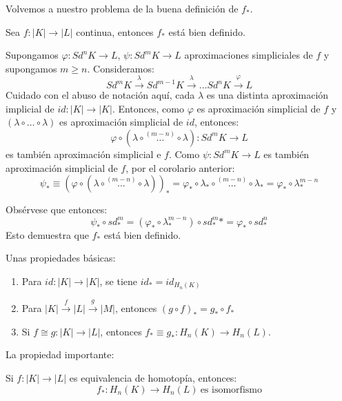 \documentclass[HS.tex]{subfiles}
\begin{document}
Volvemos a nuestro problema de la buena definición de $f_*$.

\begin{coro}
Sea $f \colon |K| \to |L|$ continua, entonces $f_*$ está bien definido.
\end{coro}
\begin{dem}
Supongamos $\varphi \colon Sd^n K \to L$, $\psi \colon Sd^m K \to L$ aproximaciones simpliciales de $f$ y supongamos $m \geq n$.
Consideramos:
\[ Sd^m K \xrightarrow{\lambda} Sd^{m-1} K \xrightarrow{\lambda} \dots Sd^n K \xrightarrow{\varphi} L \]
Cuidado con el abuso de notación aquí, cada $\lambda$ es una distinta aproximación implicial de $id \colon |K| \to |K|$.
Entonces, como $\varphi$ es aproximación simplicial de $f$ y $(\lambda \circ \dots \circ \lambda)$ es aproximación simplicial de $id$, entonces:
\[ \varphi \circ (\lambda \circ \overset{(m-n)}{\dots} \circ \lambda) \colon Sd^m K \to L\]
es también aproximación simplicial e $f$.
Como $\psi \colon Sd^m K \to L$ es también aproximación simplicial de $f$, por el corolario anterior:
\[ \psi_* \equiv (\varphi \circ (\lambda\circ\overset{(m-n)}{\dots} \circ \lambda))_* = \varphi_* \circ \lambda_* \circ \overset{(m-n)}{\dots}\circ \lambda_* = \varphi_* \circ \lambda_*^{m-n}\]

Obsérvese que entonces:
\[ \psi_* \circ sd_*^m = (\varphi_* \circ \lambda_*^{m-n}) \circ sd_*^m* =  \varphi_* \circ sd_*^n \]
Esto demuestra que $f_*$ está bien definido.
\end{dem}

Unas propiedades básicas:
\begin{propi}\mbox{}
\begin{enumerate}
	\item Para $id \colon |K| \to |K|$, se tiene $id_* = id_{H_n(K)}$
	\item Para $|K| \xrightarrow{f} |L| \xrightarrow{g} |M|$, entonces $(g \circ f)_* = g_* \circ f_*$
	\item Si $f \cong g\colon |K| \to |L|$, entonces $f_* \equiv g_* \colon H_n(K) \to H_n(L)$.
\end{enumerate}
\end{propi}
La propiedad importante:
\begin{coro}
Si $f \colon |K| \to |L|$ es equivalencia de homotopía, entonces:
\[ f_* \colon H_n(K) \to H_n(L) \ \text{es isomorfismo}\]
\end{coro}
\end{document}

